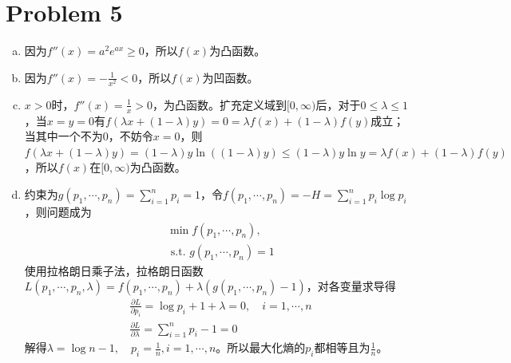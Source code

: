 \documentclass[a4paper,UTF8]{article}
\numberwithin{equation}{section}
\begin{document}
\section*{Problem 5}
\begin{enumerate}[(a)]
	\item 因为$f''(x)=a^2e^{ax}\geq 0$，所以$f(x)$为凸函数。
	\item 因为$f''(x)=-\frac{1}{x^2}< 0$，所以$f(x)$为凹函数。
	\item $x>0$时，$f''(x)=\frac{1}{x}>0$，为凸函数。扩充定义域到$[0,\infty)$后，对于$0\leq\lambda\leq 1$，当$x=y=0$有$f(\lambda x+(1-\lambda)y)=0=\lambda f(x)+(1-\lambda)f(y)$成立；当其中一个不为0，不妨令$x=0$，则$f(\lambda x+(1-\lambda)y)=(1-\lambda) y\ln((1-\lambda)y)\leq (1-\lambda)y\ln y= \lambda f(x)+(1-\lambda)f(y)$，所以$f(x)$在$[0,\infty)$为凸函数。
	\item 约束为$g(p_1,\cdots,p_n)=\sum_{i=1}^{n}p_i=1$，令$f(p_1,\cdots,p_n)=-H=\sum_{i=1}^n p_i\log p_i$，则问题成为
	\begin{align*}
		&\min f(p_1,\cdots,p_n),\\&\text{ s.t. }g(p_1,\cdots,p_n)=1
	\end{align*}
    使用拉格朗日乘子法，拉格朗日函数$L(p_1,\cdots,p_n,\lambda)=f(p_1,\cdots,p_n)+\lambda(g(p_1,\cdots,p_n)-1)$，对各变量求导得
    \begin{align*}
    	&\frac{\partial L}{\partial p_i}=\log p_i+1+\lambda = 0,\quad i=1,\cdots,n\\
    	&\frac{\partial L}{\partial \lambda}=\sum_{i=1}^n p_i-1 = 0
    \end{align*}	
    解得$\lambda=\log n-1,\quad p_i=\frac{1}{n},i=1,\cdots,n$。所以最大化熵的$p_i$都相等且为$\frac{1}{n}$。
\end{enumerate}
\end{document}
